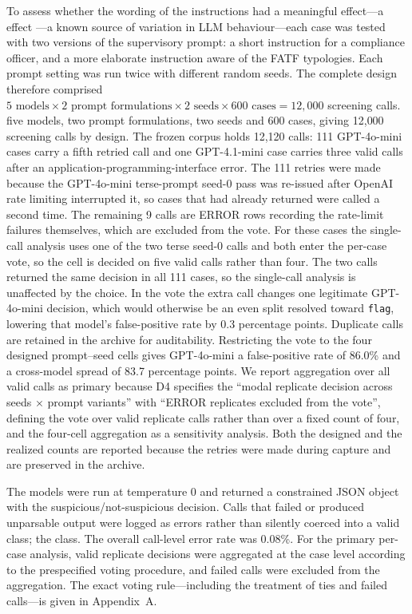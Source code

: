 \documentclass[pdflatex,sn-basic,Numbered]{sn-jnl}
\newcommand{\HLtext}[1]{\texthl{#1}}
\newcommand{\HLdel}[1]{\textcolor{HLink}{\sout{#1}}}
\renewcommand{\HLtext}[1]{#1}\renewcommand{\HLdel}[1]{#1}%
\begin{document}
To assess whether the wording of the instructions had a meaningful \HLdel{effect---a} \HLtext{effect} \cite{promptsens}\HLtext{---a} known source of variation in LLM \HLtext{behaviour---each} case was tested with two versions of the supervisory prompt: a short instruction for a compliance officer, and a more elaborate instruction aware of the FATF typologies. Each prompt setting was run twice with different random seeds. The complete design therefore comprised \HLdel{$5 \text{ models} \times 2 \text{ prompt formulations} \times 2 \text{ seeds} \times 600 \text{ cases} = 12{,}000$ screening calls.} \HLtext{five models, two prompt formulations, two seeds and 600 cases, giving} 12{,}000 \HLtext{screening calls by design. The frozen corpus holds} 12{,}120 \HLtext{calls: 111 GPT-4o-mini cases carry a fifth retried call and one GPT-4.1-mini case carries three valid calls after an application-programming-interface error. The 111 retries were made because the GPT-4o-mini terse-prompt seed-0 pass was re-issued after OpenAI rate limiting interrupted it, so cases that had already returned were called a second time. The remaining 9 calls are ERROR rows recording the rate-limit failures themselves, which are excluded from the vote. For these cases the single-call analysis uses one of the two terse seed-0 calls and both enter the per-case vote, so the cell is decided on five valid calls rather than four. The two calls returned the same decision in all 111 cases, so the single-call analysis is unaffected by the choice. In the vote the extra call changes one legitimate GPT-4o-mini decision, which would otherwise be an even split resolved toward} \texttt{flag}\HLtext{, lowering that model's false-positive rate by 0.3 percentage points. Duplicate calls are retained in the archive for auditability. Restricting the vote to the four designed prompt--seed cells gives GPT-4o-mini a false-positive rate of 86.0}\% \HLtext{and a cross-model spread of 83.7 percentage points. We report aggregation over all valid calls as primary because D4 specifies the ``modal replicate decision across seeds} $\times$ \HLtext{prompt variants'' with ``ERROR replicates excluded from the vote'', defining the vote over valid replicate calls rather than over a fixed count of four, and the four-cell aggregation as a sensitivity analysis. Both the designed and the realized counts are reported because the retries were made during capture and are preserved in the archive.}

The models were run at temperature 0 and returned a constrained JSON object with the suspicious/not-suspicious decision. Calls that failed or produced unparsable output were logged as errors rather than silently coerced into a valid \HLdel{class; the} \HLtext{class. The} overall call-level error rate was 0.08\%. For the primary per-case analysis, valid replicate decisions were aggregated at the case level according to the prespecified voting procedure, and failed calls were excluded from the aggregation. The exact voting rule---including the treatment of ties and failed calls---is given in Appendix~A.
\end{document}
